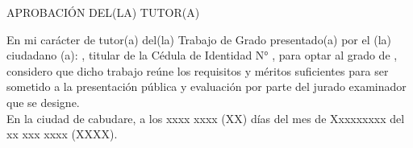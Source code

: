 \vspace*{1.5cm}
\begin{center}
\large{APROBACIÓN DEL(LA) TUTOR(A)}
\end{center}
\vspace{0.5cm}
En mi carácter de tutor(a) del(la) Trabajo de Grado \Titulo presentado(a) por el (la) ciudadano (a): \Autor, titular de la Cédula de Identidad N° \Cedula, para optar al grado de \Grado, considero que dicho trabajo reúne los requisitos y méritos suficientes para ser sometido a la presentación pública y evaluación por parte del jurado examinador que se designe. \\
En la ciudad de cabudare, a los xxxx xxxx (XX) días del mes de
Xxxxxxxxx del xx xxx xxxx (XXXX).
